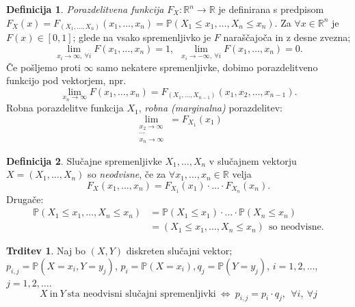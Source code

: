 \documentclass[11pt]{article}
\theoremstyle{definition}
\newtheorem{definicija}{Definicija}[section]
\theoremstyle{definition}
\newtheorem{trditev}{Trditev}[section]
\theoremstyle{definition}
\begin{document}
\begin{definicija}

\textit{Porazdelitvena funkcija} $F_X: \mathbb{R}^n \rightarrow \mathbb{R}$ je definirana s predpisom $F_X(x) = F_{(X_1, \ldots, X_n)}(x_1, \ldots, x_n) = \mathbb{P}(X_1 \leq x_1, \ldots, X_n \leq x_n)$. Za $\forall x \in \mathbb{R}^n$ je $F(x) \in [0, 1]$; glede na vsako spremenljivko je $F$ naraščajoča in z desne zvezna;
$$\lim_{x_i \rightarrow \infty, ~\forall i} F(x_1, \ldots, x_n) = 1, ~~\lim_{x_i \rightarrow -\infty, ~\forall i} F(x_1, \ldots, x_n) = 0.$$
Če pošljemo proti $\infty$ samo nekatere spremenljivke, dobimo porazdelitveno funkcijo pod vektorjem, npr.
$$\lim_{x_n \rightarrow \infty} F(x_1, \ldots, x_n) = F_{(X_1, \ldots, X_{n-1})}(x_1, x_2, \ldots, x_{n-1}).$$
Robna porazdelitve funkcija $X_1$, \textit{robna (marginalna)} porazdelitev:
$$\lim_{\substack{x_2 \rightarrow \infty \\ \cdots \\ x_n \rightarrow \infty}} = F_{X_1}(x_1)$$

\end{definicija}
\vspace{0.5cm}

\begin{definicija}

Slučajne spremenljivke $X_1, \ldots, X_n$ v slučajnem vektorju $X = (X_1, \ldots, X_n)$ so \textit{neodvisne}, če za $\forall x_1, \ldots, x_n \in \mathbb{R}$ velja 
$$F_X(x_1, \ldots, x_n) = F_{X_1}(x_1) \cdot \ldots \cdot F_{X_n}(x_n).$$
Drugače:
\begin{align*}
\mathbb{P}(X_1 \leq x_1, \ldots, X_n \leq x_n) &= \mathbb{P}(X_1 \leq x_1) \cdot \ldots \cdot \mathbb{P}(X_n \leq x_n) \\ 
&= (X_1 \leq x_1, \ldots, X_n \leq x_n) ~~\text{so neodvisne}.
\end{align*}

\end{definicija}
\vspace{0.5cm}

\begin{trditev}

Naj bo $(X, Y)$ diskreten slučajni vektor; \\$p_{i,j} = \mathbb{P}(X = x_i, Y = y_j)$, $p_i = \mathbb{P}(X = x_i), q_j = \mathbb{P}(Y = y_j)$, $i = 1, 2, \ldots$, $j = 1, 2, \ldots$.
$$X ~\text{in}~ Y ~\text{sta neodvisni slučajni spremenljivki}~ \Leftrightarrow ~p_{i,j} = p_i \cdot q_j, ~~\forall i, ~\forall j $$

\end{trditev}
\vspace{0.5cm}
\end{document}
